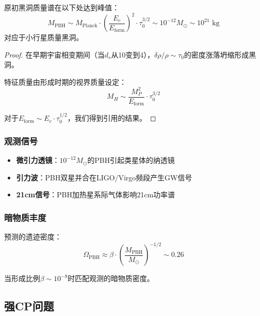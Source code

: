 \begin{theorem}[PBH质量谱]
原初黑洞质量谱在以下处达到峰值：
\begin{equation}
    M_{\text{PBH}} \sim M_{\text{Planck}} \cdot \left(\frac{E_c}{E_{\text{form}}}\right)^2 \cdot \tau_0^{3/2} \sim 10^{-12} M_\odot \sim 10^{21} \text{ kg}
\end{equation}
对应于小行星质量黑洞。
\end{theorem}

\begin{proof}
在早期宇宙相变期间（当$d_s$从10变到4），$\delta\rho/\rho \sim \tau_0$的密度涨落坍缩形成黑洞。

特征质量由形成时期的视界质量设定：
\begin{equation}
    M_H \sim \frac{M_P^2}{E_{\text{form}}} \cdot \tau_0^{3/2}
\end{equation}

对于$E_{\text{form}} \sim E_c \cdot \tau_0^{1/2}$，我们得到引用的结果。
\end{proof}

\subsubsection{观测信号}

\begin{itemize}
    \item \textbf{微引力透镜}：$10^{-12} M_\odot$的PBH引起类星体的纳透镜
    \item \textbf{引力波}：PBH双星并合在LIGO/Virgo频段产生GW信号
    \item \textbf{21cm信号}：PBH加热星系际气体影响21cm功率谱
\end{itemize}

\subsubsection{暗物质丰度}

预测的遗迹密度：
\begin{equation}
    \Omega_{\text{PBH}} \approx \beta \cdot \left(\frac{M_{\text{PBH}}}{M_\odot}\right)^{-1/2} \sim 0.26
\end{equation}

当形成比例$\beta \sim 10^{-8}$时匹配观测的暗物质密度。

\subsection{强CP问题}

